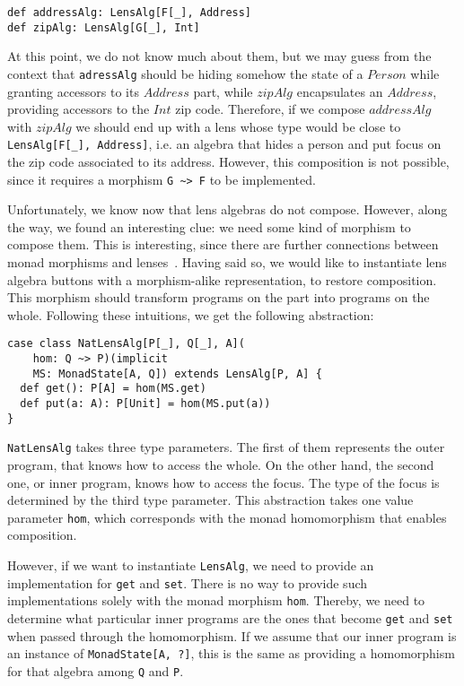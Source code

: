 \documentclass[preview, 3p]{elsarticle}
\begin{document}
\begin{lstlisting}
def addressAlg: LensAlg[F[_], Address]
def zipAlg: LensAlg[G[_], Int]
\end{lstlisting}

At this point, we do not know much about them, but we may guess from the context
that \lstinline{adressAlg} should be hiding somehow the state of a $Person$
while granting accessors to its $Address$ part, while $zipAlg$ encapsulates an
$Address$, providing accessors to the $Int$ zip code. Therefore, if we compose
$addressAlg$ with $zipAlg$ we should end up with a lens whose type would be
close to \lstinline{LensAlg[F[_], Address]}, i.e. an algebra that hides a person
and put focus on the zip code associated to its address. However, this
composition is not possible, since it requires a morphism \lstinline{G ~> F} to
be implemented.

Unfortunately, we know now that lens algebras do not compose. However, along the
way, we found an interesting clue: we need some kind of morphism to compose
them. This is interesting, since there are further connections between monad
morphisms and lenses~\cite{abou2015notions}. Having said so, we would like to
instantiate lens algebra buttons with a morphism-alike representation, to
restore composition. This morphism should transform programs on the part into
programs on the whole. Following these intuitions, we get the following
abstraction:

\begin{lstlisting}
case class NatLensAlg[P[_], Q[_], A](
    hom: Q ~> P)(implicit
    MS: MonadState[A, Q]) extends LensAlg[P, A] {
  def get(): P[A] = hom(MS.get)
  def put(a: A): P[Unit] = hom(MS.put(a))
}
\end{lstlisting}

\lstinline{NatLensAlg} takes three type parameters. The first of them represents
the outer program, that knows how to access the whole. On the other hand, the
second one, or inner program, knows how to access the focus. The type of the
focus is determined by the third type parameter. This abstraction takes one
value parameter \lstinline{hom}, which corresponds with the monad homomorphism
that enables composition.

However, if we want to instantiate \lstinline{LensAlg}, we need to provide an
implementation for \lstinline{get} and \lstinline{set}. There is no way to
provide such implementations solely with the monad morphism \lstinline{hom}.
Thereby, we need to determine what particular inner programs are the ones that
become \lstinline{get} and \lstinline{set} when passed through the homomorphism.
If we assume that our inner program is an instance of \lstinline{MonadState[A, ?]},
this is the same as providing a homomorphism for that algebra among
\lstinline{Q} and \lstinline{P}.
\end{document}
